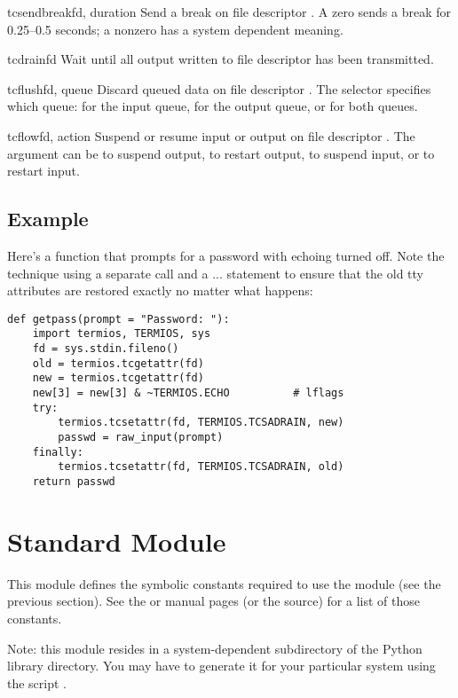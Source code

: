 \begin{funcdesc}{tcsendbreak}{fd, duration}
Send a break on file descriptor .  A zero  sends
a break for 0.25--0.5 seconds; a nonzero  has a system
dependent meaning.
\end{funcdesc}

\begin{funcdesc}{tcdrain}{fd}
Wait until all output written to file descriptor  has been
transmitted.
\end{funcdesc}

\begin{funcdesc}{tcflush}{fd, queue}
Discard queued data on file descriptor .  The 
selector specifies which queue:  for the
input queue,  for the output queue, or
 for both queues.
\end{funcdesc}

\begin{funcdesc}{tcflow}{fd, action}
Suspend or resume input or output on file descriptor .  The
 argument can be  to suspend
output,  to restart output,
 to suspend input, or
 to restart input. 
\end{funcdesc}

\subsection{Example}

Here's a function that prompts for a password with echoing turned
off.  Note the technique using a separate  call
and a  ...  statement to ensure that the
old tty attributes are restored exactly no matter what happens:

\begin{verbatim}
def getpass(prompt = "Password: "):
    import termios, TERMIOS, sys
    fd = sys.stdin.fileno()
    old = termios.tcgetattr(fd)
    new = termios.tcgetattr(fd)
    new[3] = new[3] & ~TERMIOS.ECHO          # lflags
    try:
        termios.tcsetattr(fd, TERMIOS.TCSADRAIN, new)
        passwd = raw_input(prompt)
    finally:
        termios.tcsetattr(fd, TERMIOS.TCSADRAIN, old)
    return passwd
\end{verbatim}

\section{Standard Module }
\label{module-TERMIOSuppercase}


This module defines the symbolic constants required to use the
 module (see the previous
section).  See the \POSIX{} or \UNIX{} manual pages (or the source)
for a list of those constants.

Note: this module resides in a system-dependent subdirectory of the
Python library directory.  You may have to generate it for your
particular system using the script .
